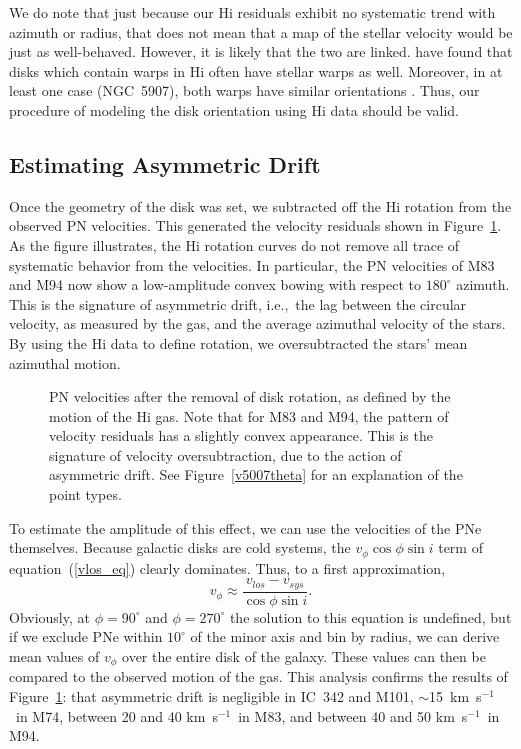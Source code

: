 \documentclass[12pt,preprint]{emulateapj}
\newcommand{\ie}{{i.e.,}}
\newcommand{\kms}{km~s$^{-1}$}
\begin{document}
We do note that just because our H{\sc i} residuals exhibit no systematic trend with azimuth or radius, that does not mean that a map of the stellar velocity would be just as well-behaved.   However, it is likely that the two are linked.  \citet[][and references therein]{m+97} have found that disks which contain warps in H{\sc i} often have stellar warps as well.  Moreover, in at least one case (NGC~5907), both warps have similar orientations \citep{m+94}.  Thus, our procedure of modeling the disk orientation using H{\sc i} data should be valid.

\subsection{Estimating Asymmetric Drift}
Once the geometry of the disk was set, we subtracted off the H{\sc i} rotation from the observed PN velocities.  This generated the velocity residuals shown in Figure~\ref{vres0phi}.  As the figure illustrates, the H{\sc i} rotation curves do not remove all trace of systematic behavior from the velocities.  In particular, the PN velocities of M83 and M94 now show a low-amplitude convex bowing with respect to $180^\circ$ azimuth.  This is the signature of asymmetric drift, \ie\ the lag between the circular velocity, as measured by the gas, and the average azimuthal velocity of the stars.   By using the H{\sc i} data to define rotation, we oversubtracted the stars' mean azimuthal motion.

\begin{figure}
\caption{\scriptsize PN velocities after the removal of disk rotation, as defined by the motion of the H{\sc i} gas.  Note that for M83 and M94, the pattern of velocity residuals has a slightly convex appearance.  This is the signature of velocity oversubtraction, due to the action of asymmetric drift.  See Figure~\ref{v5007theta} for an explanation of the point types. \label{vres0phi} }
\end{figure}

To estimate the amplitude of this effect, we can use the velocities of the PNe themselves.  Because galactic disks are cold systems, the $v_{\phi} \cos \phi \sin i$ term of equation~(\ref{vlos_eq}) clearly dominates.  Thus, to a first approximation,
\begin{equation}
v_{\phi} \approx \frac{v_{los} - v_{sys}}{\cos \phi \sin i}.
\end{equation}
Obviously, at $\phi = 90^\circ$ and $\phi = 270^\circ$ the solution to this equation is undefined, but if we exclude PNe within $10^\circ$ of the minor axis and bin by radius, we can derive mean values of $v_{\phi}$ over the entire disk of the galaxy.  These values can then be compared to the observed motion of the gas.  This analysis confirms the results of Figure~\ref{vres0phi}: that asymmetric drift is negligible in IC~342 and M101, $\sim$15~\kms\ in M74, between 20 and 40 \kms\ in M83, and between 40 and 50 \kms\ in M94.
\end{document}
